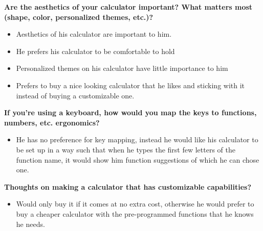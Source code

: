 \documentclass{article}
\begin{document}
\textbf{Are the aesthetics of your calculator important? What matters most (shape, color,  personalized themes, etc.)?}
\begin{itemize}
\itemsep0em 
\item Aesthetics of his calculator are important to him.
\item He prefers his calculator to be comfortable to hold 
\item Personalized themes on his calculator have little importance to him
\item Prefers to buy a nice looking calculator that he likes and sticking with it instead of buying a customizable one.
\end{itemize}

\textbf{If you’re using a keyboard, how would you map the keys to functions, numbers, etc. ergonomics?}
\begin{itemize}
\itemsep0em 
\item He has no preference for key mapping, instead he would like his calculator to be set up in a way such that when he types the first few letters of the function name, it would show him function suggestions of which he can chose one.
\end{itemize}

\textbf{Thoughts on making a calculator that has customizable capabilities? }
\begin{itemize}
\itemsep0em 
\item Would only buy it if it comes at no extra cost, otherwise he would prefer to buy a cheaper calculator with the pre-programmed functions that he knows he needs.
\end{itemize}
\pagebreak
\end{document}
